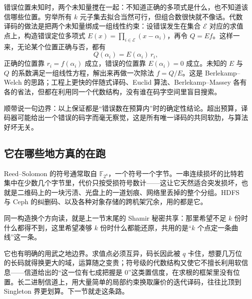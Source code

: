 错误位置未知时，两个未知量搅在一起：不知道正确的多项式是什么，也不知道该信哪些位置。穷举所有 \(k\) 元子集去拟合当然可行，但组合数很快就不像话。代数译码的做法是把两个未知量绑成一组线性约束：设错误发生在集合 \(\mathcal E\) 对应的求值点上，构造错误定位多项式 \(E(x)=\prod_{i\in\mathcal E}(x-\alpha_i)\)，再令 \(Q=Ef\)。这样一来，无论某个位置正确与否，都有
\[
Q(\alpha_i)=E(\alpha_i)\,r_i ,
\]
正确的位置靠 \(r_i=f(\alpha_i)\) 成立，错误的位置靠 \(E(\alpha_i)=0\) 成立。未知的 \(E\) 与 \(Q\) 的系数满足一组线性方程，解出来再做一次除法 \(f=Q/E\)。这是 Berlekamp--Welch 的思路；工程上更快的伴随式译码、Euclid 算法、Berlekamp--Massey 各有各的省法，但都在利用同一个代数结构，没有谁在码字空间里盲目搜索。

顺带说一句边界：以上保证都是``错误数在预算内''时的确定性结论。超出预算，译码器可能给出一个错误的码字而毫无察觉，这是所有唯一译码的共同软肋，与算法好坏无关。

\subsection{它在哪些地方真的在跑}

Reed--Solomon 的符号通常取自 \(\mathbb F_{2^8}\)，一个符号一个字节。一串连续损坏的比特若集中在少数几个字节里，代价只按受损符号数计——这让它天然适合突发损坏，也就是二维码上的一块污渍、光盘上的一道划痕、网络里丢掉的整个分组。HDFS 与 Ceph 的纠删码、以及各种对象存储的跨机架冗余，用的都是它。

同一构造换个方向读，就是上一节末尾的 Shamir 秘密共享：那里希望不足 \(k\) 份时什么都得不到，这里希望凑够 \(k\) 份时什么都能还原，共用的是``\(k\) 个点定一条曲线''这一条。

它也有明确的用武之地边界。求值点必须互异，码长因此被 \(q\) 卡住，想要几万位的长码就得换更大的域，运算随之变贵；符号级的代数结构又使它不擅长利用软信息——信道给出的``这一位有七成把握是 0''这类置信度，在求根的框架里没有位置。长二进制信道上，用大量简单的局部约束换取廉价的迭代译码，往往比顶到 Singleton 界更划算。下一节就走这条路。
